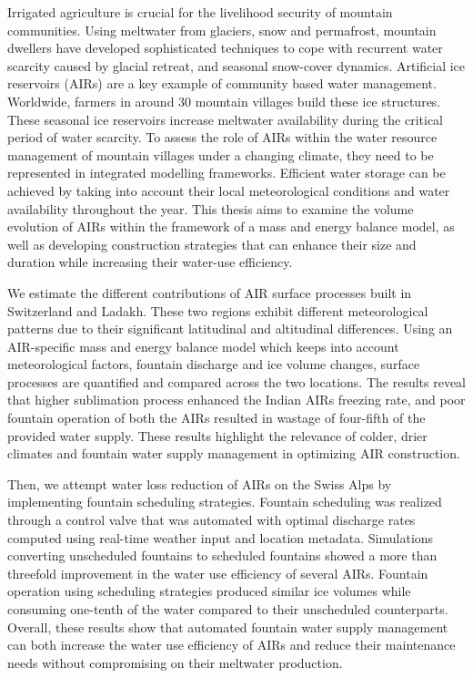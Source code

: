 %
\label{sec:abstract}

Irrigated agriculture is crucial for the livelihood security of mountain communities. Using meltwater from
glaciers, snow and permafrost, mountain dwellers have developed sophisticated techniques to cope with recurrent
water scarcity caused by glacial retreat, and seasonal snow-cover dynamics. Artificial ice
reservoirs (AIRs) are a key example of community based water management. Worldwide, farmers in around 30 mountain
villages build these ice structures. These seasonal ice reservoirs increase meltwater availability during the
critical period of water scarcity. To assess the role of AIRs within the water resource management of
mountain villages under a changing climate, they need to be represented in integrated modelling frameworks.
Efficient water storage can be achieved by taking into account their local meteorological conditions and
water availability throughout the year. This thesis aims to examine the volume evolution of AIRs within the
framework of a mass and energy balance model, as well as developing construction strategies that can enhance
their size and duration while increasing their water-use efficiency.

We estimate the different contributions of AIR surface processes built in Switzerland and
Ladakh. These two regions exhibit different meteorological patterns due to their significant latitudinal
and altitudinal differences. Using an AIR-specific mass and energy balance model which keeps into account
meteorological factors, fountain discharge and ice volume changes, surface processes are quantified and compared
across the two locations. The results reveal that higher sublimation process enhanced the Indian AIRs freezing
rate, and poor fountain operation of both the AIRs resulted in wastage of four-fifth of the provided water supply.
These results highlight the relevance of colder, drier climates and fountain water supply
management in optimizing AIR construction.

Then, we attempt water loss reduction of AIRs on the Swiss Alps by implementing
fountain scheduling strategies. Fountain scheduling was realized through a control valve that was automated with
optimal discharge rates computed using real-time weather input and location metadata. Simulations converting
unscheduled fountains to scheduled fountains showed a more than threefold improvement in the water use
efficiency of several AIRs. Fountain operation using scheduling strategies produced similar ice volumes while
consuming one-tenth of the water compared to their unscheduled counterparts.  Overall, these results show that
automated fountain water supply management can both increase the water use efficiency of AIRs and reduce their
maintenance needs without compromising on their meltwater production.

